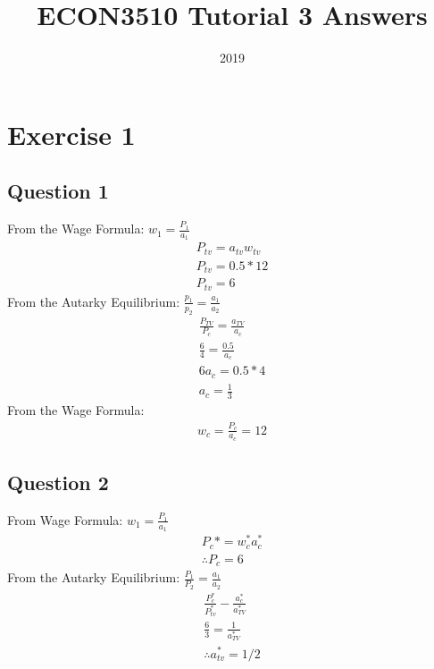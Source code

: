 \documentclass{article}
\title{ECON3510 Tutorial 3 Answers}
\date{2019}
\begin{document}
\maketitle

\section{Exercise 1}
\vspace{6mm}
\subsection{Question 1}

From the Wage Formula: $w_{1} = \tfrac{P_{1}}{a_{1}}$ \\
\begin{gather*}
  P_{tv} = a_{tv}w_{tv} \\
  P_{tv} = 0.5*12 \\
  P_{tv} = 6
\end{gather*}
From the Autarky Equilibrium: $\tfrac{p_{1}}{p_{2}} = \tfrac{a_{1}}{a_{2}}$ \\
\begin{gather*}
  \frac{P_{TV}}{P_{c}} = \frac{a_{TV}}{a_{c}} \\
  \frac{6}{4} = \frac{0.5}{a_{c}} \\
  6a_{c} = 0.5*4 \\
  a_{c} = \frac{1}{3}
\end{gather*}
From the Wage Formula: \\
\begin{gather*}
  w_{c} = \frac{P_{c}}{a_{c}} = 12
\end{gather*}

\par \vspace{0.8em}
\subsection{Question 2}

From Wage Formula: $w_{1} = \tfrac{P_{1}}{a_{1}}$ \\
\begin{gather*}
  P_{c}* = w_{c}^{*}a_{c}^{*} \\
  \therefore P_{c} = 6
\end{gather*}
From the Autarky Equilibrium:  $\tfrac{P_{1}}{P_{2}} = \tfrac{a_{1}}{a_{2}}$ \\
\begin{gather*}
  \frac{P_{c}^{*}}{P_{tv}^{*}} - \frac{a_{c}^{*}}{a_{TV}^{*}} \\
  \frac{6}{3} = \frac{1}{a_{TV}^{*}} \\
  \therefore a_{tv}^{*} = 1/2
\end{gather*}
\end{document}
